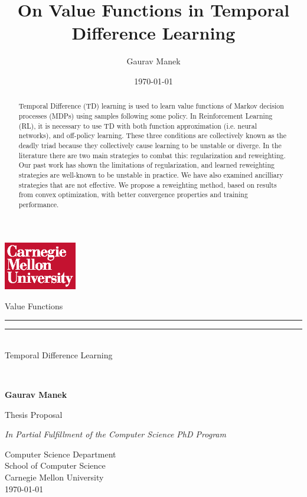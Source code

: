 \documentclass[11pt]{article}
\title{ On Value Functions in Temporal Difference Learning }
\author{ Gaurav Manek }
\date{\today}
\begin{document}
\begin{titlepage}
    {
        \hfill\includegraphics[width=1.25in,trim=0 0 .125in .25in]{cmu/cmu-wordmark-square-w-on-r.eps}
    }
    \begin{center}{\SourceSerifPro
        \vfill

        {\Huge\OpenSans
            {
                {Value Functions}\\[-.5em]
                \rule{0.25\textwidth}{1pt}
                \rule{0.25\textwidth}{1pt}\\[.5em]
                {Temporal Difference Learning}
            }
        }\\


        \vspace{0.25in}

        \textbf{\large Gaurav Manek}\\

        \vfill

        Thesis Proposal

        \textit{In Partial Fulfillment of the Computer Science PhD Program}

        \vspace{0.33in}
        Computer Science Department\\
        School of Computer Science\\
        Carnegie Mellon University\\
        \today

    }\end{center}
\end{titlepage}

\cleardoublepage

~\vfill
\begin{center}
    \begin{minipage}[c]{.7\textwidth}
        \begin{abstract}
            Temporal Difference (TD) learning is used to learn value functions of Markov decision processes (MDPs) using samples following some policy. In Reinforcement Learning (RL), it is necessary to use TD with both function approximation (i.e. neural networks), and off-policy learning. These three conditions are collectively known as the deadly triad because they collectively cause learning to be unstable or diverge. In the literature there are two main strategies to combat this: regularization and reweighting. Our past work has shown the limitations of regularization, and learned reweighting strategies are well-known to be unstable in practice. We have also examined ancilliary strategies that are not effective. We propose a reweighting method, based on results from convex optimization, with better convergence properties and training performance.
        \end{abstract}
    \end{minipage}
\end{center}
\end{document}
